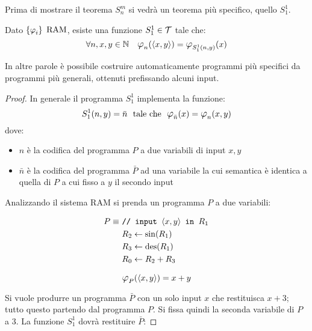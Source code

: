 Prima di mostrare il teorema $S_n^m$ si vedrà un teorema più specifico, quello
$S_1^1$.
\begin{theorem}[$S_1^1$]
    Dato $\sistProg$ $\text{RAM}$, esiste una funzione $S_1^1\in\mathcal{T}$ tale che:
    $$ \forall n,x,y\in\N \quad \semRAM_n(\cantor{x,y})
    = \semRAM_{S_1^1(n,y)}(x) $$
\end{theorem}
In altre parole è possibile costruire automaticamente programmi più specifici
da programmi più generali, ottenuti prefissando alcuni input.
\begin{proof}
In generale il programma $S_1^1$ implementa la funzione:
$$ S_1^1(n,y) = \bar{n} \ \text{ tale che } \ \semRAM_{\bar{n}}(x)
=\semRAM_n (x,y)$$
dove:
\begin{itemize}
    \item $n$ è la codifica del programma $P$ a due variabili di input $x,y$
    \item $\bar{n}$ è la codifica del programma $\bar{P}$ ad una variabile
        la cui semantica è identica a quella di $P$ a cui fisso a $y$ il
        secondo input
\end{itemize}

Analizzando il sistema RAM si prenda un programma $P$ a due variabili:

\vspace{-1em}
\begin{minipage}{.4\textwidth}
    \begin{align}
        P \equiv\ & \texttt{// input $\langle x,y\rangle$ in $R_1$}   \notag\\
        & R_2 \leftarrow \sin(R_1)                     \notag\\
        & R_3 \leftarrow \text{des}(R_1)                      \notag\\
        & R_0 \leftarrow R_2+R_3                       \notag
    \end{align}
\end{minipage}
\begin{minipage}{.4\textwidth}
    $$ \semRAM_P(\cantor{x,y})=x+y $$
\end{minipage}

Si vuole produrre un programma $\bar{P}$ con un solo input $x$ che restituisca
$x+3$; tutto questo partendo dal programma $P$. Si fissa quindi la seconda variabile
di $P$ a 3. La funzione $S_1^1$ dovrà restituire $\bar{P}$:


\end{proof}
